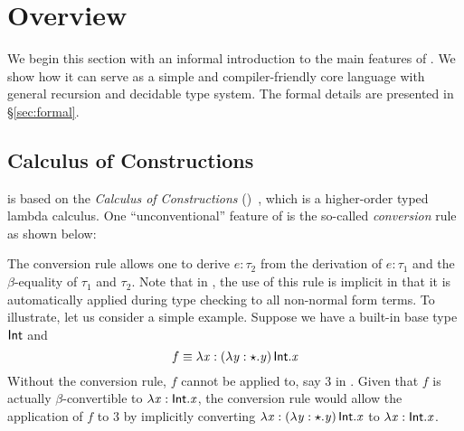 \newcommand{\invisiblecomments}{%
  \let\onelinecomment=\empty
  \let\commentbegin=\empty
  \let\commentend=\empty}

\visiblecomments

\newlength{\blanklineskip}
\setlength{\blanklineskip}{0.66084ex}

\newcommand{\hsindent}[1]{\quad}%
\let\hspre\empty
\let\hspost\empty
\newcommand{\NB}{\textbf{NB}}
\newcommand{\Todo}[1]{$\langle$\textbf{To do:}~#1$\rangle$}

\EndFmtInput
\makeatother
%

\section{Overview}


We begin this section with an informal introduction to the main features of \name. We show how it can serve as a simple and compiler-friendly core language with general recursion and decidable type system. The formal details are presented in \S\ref{sec:formal}.

\subsection{Calculus of Constructions}
\label{sec:coc}

\name is based on the \emph{Calculus of Constructions} (\coc)~\cite{coc}, which is a higher-order typed lambda calculus. One ``unconventional'' feature of \coc is the so-called \emph{conversion} rule as shown below:
\ottusedrule{\ottdruleTccXXConv{}}

The conversion rule allows one to derive $e:\tau_{{\mathrm{2}}}$ from the derivation of $e:\tau_{{\mathrm{1}}}$ and the $\beta$-equality of $\tau_{{\mathrm{1}}}$ and $\tau_{{\mathrm{2}}}$. Note that in \coc, the use of this rule is implicit in that it is automatically applied during type checking to all non-normal form terms. To illustrate, let us consider a simple example. Suppose we have a built-in base type $ \mathsf{Int} $ and \[f \equiv \lambda  \mathit{x}  :  (  \lambda  \mathit{y}  :  \star  .  \mathit{y}  ) \, \mathsf{Int}  .  \mathit{x} \] Without the conversion rule, $f$ cannot be applied to, say $3$ in \coc. Given that $f$ is actually $\beta$-convertible to $\lambda  \mathit{x}  :  \mathsf{Int}  .  \mathit{x}$, the conversion rule would allow the application of $f$ to $3$ by implicitly converting $\lambda  \mathit{x}  :  (  \lambda  \mathit{y}  :  \star  .  \mathit{y}  ) \, \mathsf{Int}  .  \mathit{x}$ to $\lambda  \mathit{x}  :  \mathsf{Int}  .  \mathit{x}$.

